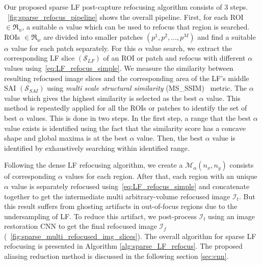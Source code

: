 Our proposed sparse LF post-capture refocusing algorithm consists of 3 steps. \figurename~\ref{fig:sparse_refocus_pipeline} shows the overall pipeline. First, for each ROI $\in \mathfrak{R}_{n}$, a suitable $\alpha$ value which can be used to refocus that region is searched. ROIs $\in \mathfrak{R}_{w}$ are divided into smaller patches $(p^1, p^2, ..., p^M)$ and find a suitable $\alpha$ value for each patch separately. For this $\alpha$ value search, we extract the corresponding LF slice $(\mathcal{S}_{LF})$ of an ROI or patch and refocus with different $\alpha$ values using~\eqref{eq:LF_refocus_simple}. We measure the similarity between resulting refocused image slices and the corresponding area of the LF's middle SAI $(\mathcal{S}_{SAI})$ using \emph{multi scale structural similarity} (MS\_SSIM)~\cite{ms_ssim} metric. The $\alpha$ value which gives the highest similarity is selected as the best $\alpha$ value. This method is repeatedly applied for all the ROIs or patches to identify the set of best $\alpha$ values. This is done in two steps. In the first step, a range that the best $\alpha$ value exists is identified using the fact that the similarity score has a concave shape and global maxima is at the best $\alpha$ value. Then, the best $\alpha$ value is identified by exhaustively searching within identified range.

Following the dense LF refocusing algorithm, we create a $\mathcal{M}_{\alpha}(n_x,n_y)$ consists of corresponding $\alpha$ values for each region. After that, each region with an unique $\alpha$ value is separately refocused using~\eqref{eq:LF_refocus_simple} and concatenate together to get the intermediate multi arbitrary-volume refocused image $\mathcal{I}_t$. But this result suffers from ghosting artifacts in out-of-focus regions due to the undersampling of LF. To reduce this artifact, we post-process  $\mathcal{I}_t$ using an image restoration CNN to get the final refocused image  $\mathcal{I}_f$ (\figurename~\ref{fig:sparse_multi_refocused_img_slices}). The overall algorithm for sparse LF refocusing is presented in Algorithm \ref{alg:sparse_LF_refocus}. The proposed aliasing reduction method is discussed in the following section \ref{sec:cnn}.

